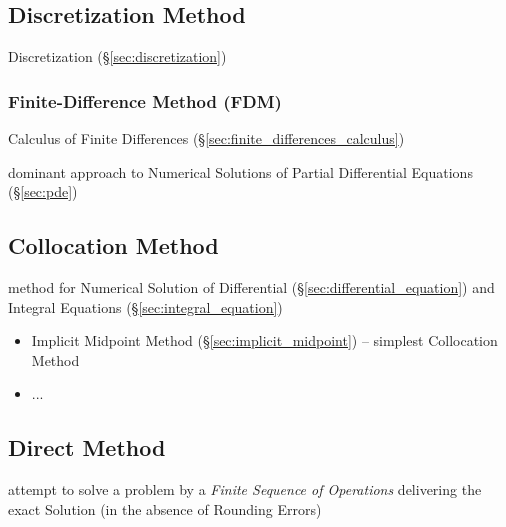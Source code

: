 \subsection{Discretization Method}\label{sec:discretization_method}

Discretization (\S\ref{sec:discretization})



\subsubsection{Finite-Difference Method (FDM)}\label{sec:fdm}

Calculus of Finite Differences (\S\ref{sec:finite_differences_calculus})

dominant approach to Numerical Solutions of Partial Differential Equations
(\S\ref{sec:pde})



\subsection{Collocation Method}\label{sec:collocation_method}

method for Numerical Solution of Differential
(\S\ref{sec:differential_equation}) and Integral Equations
(\S\ref{sec:integral_equation})

\begin{itemize}
  \item Implicit Midpoint Method (\S\ref{sec:implicit_midpoint}) -- simplest
    Collocation Method
  \item ...
\end{itemize}



\subsection{Direct Method}\label{sec:direct_method}

attempt to solve a problem by a \emph{Finite Sequence of Operations} delivering
the exact Solution (in the absence of Rounding Errors)

